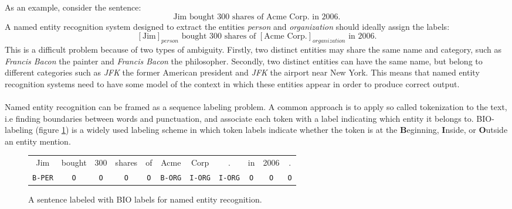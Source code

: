 As an example, consider the sentence: 
$$
\text{Jim bought 300 shares of Acme Corp. in 2006.}
$$ 
A named entity recognition system designed to extract the entities \textit{person} and \textit{organization} should ideally assign the labels:
$$
	[\text{Jim}]_{person} \text{ bought 300 shares of } [\text{Acme Corp.}]_{organization} \text{ in 2006.}
$$
This is a difficult problem because of two types of ambiguity. Firstly, two distinct entities may share the same name and category, such as \textit{Francis Bacon} the painter and \textit{Francis Bacon} the philosopher. Secondly, two distinct entities can have the same name, but belong to different categories such as \textit{JFK} the former American president and \textit{JFK} the airport near New York. This means that named entity recognition systems need to have some model of the context in which these entities appear in order to produce correct output.
\\\\
Named entity recognition can be framed as a sequence labeling problem. A common approach is to apply so called tokenization to the text, i.e finding boundaries between words and punctuation, and associate each token with a label indicating which entity it belongs to. BIO-labeling (figure \ref{bio}) is a widely used labeling scheme in which token labels indicate whether the token is at the \textbf{B}eginning, \textbf{I}nside, or \textbf{O}utside an entity mention.
\begin{figure}
	\begin{center}
		\begin{tabular}{c c c c c c c c c c c}
	Jim & bought & 300 & shares & of & Acme & Corp & . & in & 2006 & . \\
	\texttt{B-PER} & \texttt{O} & \texttt{O} & \texttt{O} & \texttt{O} & \texttt{B-ORG} & \texttt{I-ORG} & \texttt{I-ORG} & \texttt{O} & \texttt{O} & \texttt{O}
	\end{tabular}
	\end{center}
	\caption{A sentence labeled with BIO labels for named entity recognition.}
	\label{bio}
\end{figure}

